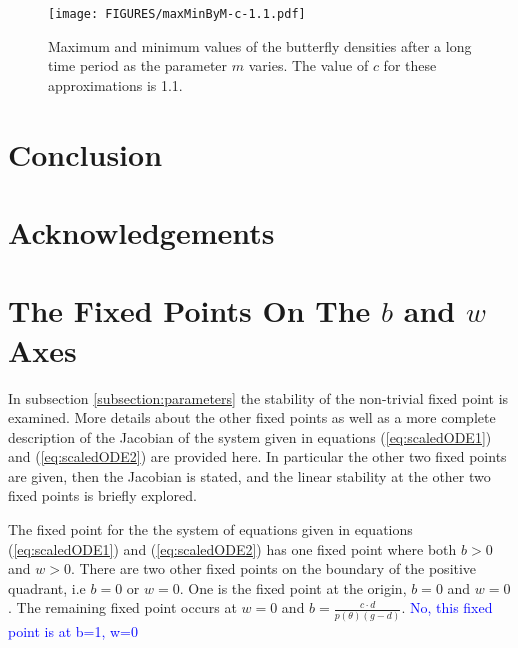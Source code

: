 \documentclass[review,authoryear]{elsarticle}
\begin{document}
\begin{figure}[htb]
  \centering
  \texttt{[image: FIGURES/maxMinByM-c-1.1.pdf]}
  \caption[Maximum and minimum values of the butterfly
  density with $c=1.1$]{Maximum and minimum values of the butterfly densities after
    a long time period as the parameter $m$ varies. The value of $c$ for these approximations is 1.1.}
  \label{fig:maxMinButterflySmallMu-c-1.1}
\end{figure}


\section{Conclusion}

\section{Acknowledgements}

\clearpage

\appendix

\section{The Fixed Points On The $b$ and $w$ Axes}
\label{appendix:otherFixedPoints}

In subsection \ref{subsection:parameters} the stability of the
non-trivial fixed point is examined. More details about the other
fixed points as well as a more complete description of the Jacobian of
the system given in equations (\ref{eq:scaledODE1}) and
(\ref{eq:scaledODE2}) are provided here. In particular the other two
fixed points are given, then the Jacobian is stated, and the linear
stability at the other two fixed points is briefly explored.

The fixed point for the the system of equations given in equations
(\ref{eq:scaledODE1}) and (\ref{eq:scaledODE2}) has one fixed point
where both $b>0$ and $w>0$. There are two other fixed points on the boundary of the positive quadrant, i.e $b=0$ or $w=0$.  One is the fixed point at the origin, $b=0$ and $w=0$.
The remaining fixed point occurs at $w=0$ and $b=\frac{c\cdot
  d}{p(\theta)\left(g - d\right)}$. \textcolor{blue} {No, this fixed point is at b=1, w=0}
  
\end{document}
